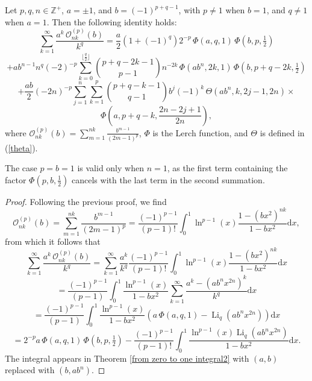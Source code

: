 \documentclass[11pt,reqno]{article}
\begin{document}
\begin{theorem}\label{thm of O_n}
	Let $p,q,n\in\mathbb{Z}^{+}$, $a=\pm1$, and $b={(-1)}^{p+q-1}$, with $p\neq1$ when $b=1$, and $q\neq1$ when $a=1$. Then the following identity holds:
	\[\sum_{k=1}^\infty\frac{a^k\,\mathcal{O}_{nk}^{(p)}(b)}{k^q}=\frac{a}{2}(1+{(-1)}^{q})2^{-p}\,\Phi(a,q,1)\,\Phi(b,p,\tfrac12)\]
	\[+ab^{n-1}n^q{(-2)}^{-p}\sum_{k=0}^{\lfloor\frac{q}{2}\rfloor}\binom{p+q-2k-1}{p-1}n^{-2k}\,\Phi(ab^n,2k,1)\,\Phi(b,p+q-2k,\tfrac{1}{2})\]
	\[+\frac{ab}{2} {(-2n)}^{-p}\sum_{j=1}^{n}\sum_{k=1}^{p}\binom{p+q-k-1}{q-1}b^j{(-1)}^{k}\,\Theta(ab^n,k,2j-1,2n)\times\]
	\[\Phi\left(a,p+q-k,\frac{2n-2j+1}{2n}\right),\]
	where $\mathcal{O}_{nk}^{(p)}(b)=\sum_{m=1}^{nk}\frac{b^{m-1}}{{(2m-1)}^{p}}$, $\Phi$ is the Lerch function, and $\Theta$ is defined in (\ref{theta}).
\end{theorem}
\begin{remark}
	The case $p=b=1$ is valid only when $n=1$, as the first term containing the factor $\Phi(p,b,\tfrac 12)$ cancels with the last term in the second summation.
\end{remark}
\begin{proof} Following the previous proof, we find
	\[\mathcal{O}_{nk}^{(p)}(b)=\sum_{m=1}^{nk}\frac{b^{m-1}}{(2m-1)^p}=\frac{{(-1)}^{p-1}}{(p-1)!}\int_0^1 \ln^{p-1}(x)\frac{1-(bx^2)^{nk}}{1-bx^2}\mathrm{d} x,\]
	from which it follows that
	\[\sum_{k=1}^\infty\frac{a^k\, \mathcal{O}_{nk}^{(p)}(b)}{k^q}=\sum_{k=1}^\infty\frac{a^k}{k^q}\frac{{(-1)}^{p-1}}{(p-1)!}\int_0^1 \ln^{p-1}(x)\frac{1-(bx^2)^{nk}}{1-bx^2}\mathrm{d} x\]	
	\[=\frac{{(-1)}^{p-1}}{(p-1)}\int_0^1\frac{\ln^{p-1}(x)}{1-bx^2}\sum_{k=1}^\infty\frac{a^k-(ab^nx^{2n})^k}{k^q}\mathrm{d} x\]
	\[=\frac{{(-1)}^{p-1}}{(p-1)}\int_0^1\frac{\ln^{p-1}(x)}{1-bx^2}\left(a\,\Phi(a,q,1)-\operatorname{Li}_q\left(ab^nx^{2n}\right)\right)\mathrm{d} x\]	
	\[=2^{-p}a\,\Phi(a,q,1)\,\Phi(b,p,\tfrac{1}{2})-\frac{{(-1)}^{p-1}}{(p-1)!}\int_0^1\frac{\ln^{p-1}(x)\operatorname{Li}_q\left(ab^nx^{2n}\right)}{1-bx^2}\mathrm{d} x.\]
	The integral appears in Theorem \ref{from zero to one integral2} with $(a,b)$ replaced with $(b,ab^n)$.	
\end{proof}
\end{document}
